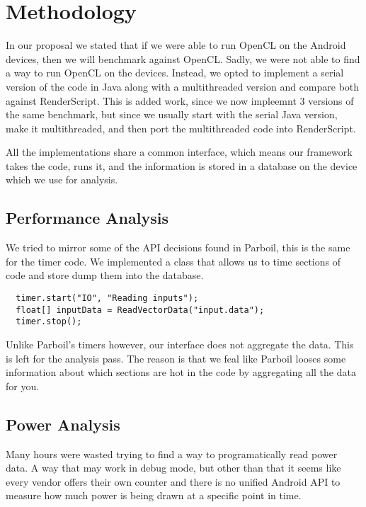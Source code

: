 
\section*{Methodology}

In our proposal we stated that if we were able to run OpenCL on the Android devices, then
  we will benchmark against OpenCL.
Sadly, we were not able to find a way to run OpenCL on the devices.
Instead, we opted to implement a serial version of the code in Java along with a multithreaded version
  and compare both against RenderScript.
This is added work, since we now impleemnt 3 versions of the same benchmark, but since we usually
  start with the serial Java version, make it multithreaded, and then port the multithreaded code
  into RenderScript.

All the implementations share a common interface, which means our framework takes the code,
  runs it, and the information is stored in a database on the device which we use for analysis.

\subsection*{Performance Analysis}

We tried to mirror some of the API decisions found in Parboil, this is the same for the timer code.
We implemented a class that allows us to time sections of code and store dump them into the database.

\begin{verbatim}
  timer.start("IO", "Reading inputs");
  float[] inputData = ReadVectorData("input.data");
  timer.stop();
\end{verbatim}

Unlike Parboil's timers however, our interface does not aggregate the data.
This is left for the analysis pass.
The reason is that we feal like Parboil looses some information about which sections are hot in the
  code by aggregating all the data for you.

\subsection*{Power Analysis}

Many hours were wasted trying to find a way to programatically read power data.
A way that may work in debug mode, but other than that it seems like every vendor offers their own
  counter and there is no unified Android API to measure how much power is being drawn at a 
  specific point in time.
